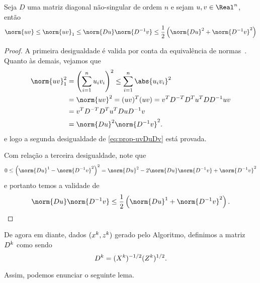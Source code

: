 \begin{prop}\label{prop:norm-uv}
	Seja $D$ uma matriz diagonal não-singular de ordem $n$ e sejam $u,v\in\Real^n$, então 
	\begin{equation}
		\label{eq:prop-uvDuDv}
		\norm{uv}\leq \norm{uv}_1 \leq \norm{Du}\norm{D^{-1}v} \leq \frac{1}{2}\left(\norm{Du}^{2} + \norm{D^{-1}v}^{2}\right)
	\end{equation}
\end{prop}
\begin{proof} A primeira desigualdade é valida por conta da equivalência de normas~\cite[p.~53]{Golub:1996wp}. Quanto às demais, vejamos que 
\[
	\begin{aligned}
		\norm{uv}_1^{2} & = \left( \sum_{i=1}^{n}u_i v_i  \right)^{2} \leq  \sum_{i=1}^{n}\abs{u_iv_i}^{2}\\
						& = \norm{uv}^{2} = (uv)^{T}(uv)  = v^{T}D^{-T}D^{T}u^{T}DD^{-1} uv\\
						& = v^{T}D^{-T}D^{T}u^{T}DuD^{-1}v\\
						& = \norm{Du}^{2}\norm{D^{-1}v}^{2}.
	\end{aligned}
	\]
e logo a segunda desigualdade de \eqref{eq:prop-uvDuDv} está provada. 

Com relação a terceira desigualdade, note que  
\[
0 \leq \left(\norm{Du}^{1} - \norm{D^{-1}v}^{2}\right)^{2} = \norm{Du}^{2} - 2\norm{Du}\norm{D^{-1}v} + \norm{D^{-1}v}^{2}
\]
e portanto temos a validade de
\[
\norm{Du}\norm{D^{-1}v} \leq \frac{1}{2}\left(\norm{Du}^{1} + \norm{D^{-1}v}^{2}\right). \qedhere
\]
\end{proof}

De agora em diante, dados $(x^{k},z^{k})$ gerado pelo Algoritmo, definimos a matriz $D^{k}$ como sendo
\[
D^{k} =(X^{k})^{-1/2}(Z^{k})^{1/2}.
\]

Assim, podemos enunciar o seguinte lema.

